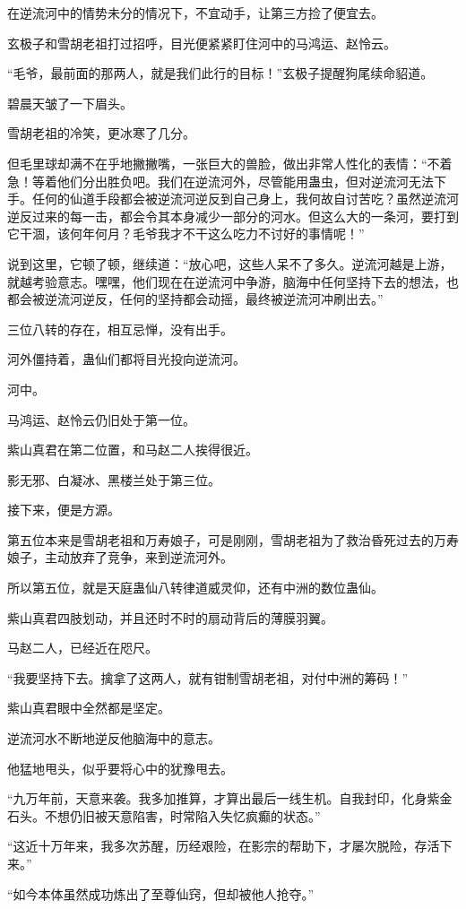 \begin{this_body}
在逆流河中的情势未分的情况下，不宜动手，让第三方捡了便宜去。

玄极子和雪胡老祖打过招呼，目光便紧紧盯住河中的马鸿运、赵怜云。

“毛爷，最前面的那两人，就是我们此行的目标！”玄极子提醒狗尾续命貂道。

碧晨天皱了一下眉头。

雪胡老祖的冷笑，更冰寒了几分。

但毛里球却满不在乎地撇撇嘴，一张巨大的兽脸，做出非常人性化的表情：“不着急！等着他们分出胜负吧。我们在逆流河外，尽管能用蛊虫，但对逆流河无法下手。任何的仙道手段都会被逆流河逆反到自己身上，我何故自讨苦吃？虽然逆流河逆反过来的每一击，都会令其本身减少一部分的河水。但这么大的一条河，要打到它干涸，该何年何月？毛爷我才不干这么吃力不讨好的事情呢！”

说到这里，它顿了顿，继续道：“放心吧，这些人呆不了多久。逆流河越是上游，就越考验意志。嘿嘿，他们现在在逆流河中争游，脑海中任何坚持下去的想法，也都会被逆流河逆反，任何的坚持都会动摇，最终被逆流河冲刷出去。”

三位八转的存在，相互忌惮，没有出手。

河外僵持着，蛊仙们都将目光投向逆流河。

河中。

马鸿运、赵怜云仍旧处于第一位。

紫山真君在第二位置，和马赵二人挨得很近。

影无邪、白凝冰、黑楼兰处于第三位。

接下来，便是方源。

第五位本来是雪胡老祖和万寿娘子，可是刚刚，雪胡老祖为了救治昏死过去的万寿娘子，主动放弃了竞争，来到逆流河外。

所以第五位，就是天庭蛊仙八转律道威灵仰，还有中洲的数位蛊仙。

紫山真君四肢划动，并且还时不时的扇动背后的薄膜羽翼。

马赵二人，已经近在咫尺。

“我要坚持下去。擒拿了这两人，就有钳制雪胡老祖，对付中洲的筹码！”

紫山真君眼中全然都是坚定。

逆流河水不断地逆反他脑海中的意志。

他猛地甩头，似乎要将心中的犹豫甩去。

“九万年前，天意来袭。我多加推算，才算出最后一线生机。自我封印，化身紫金石头。不想仍旧被天意陷害，时常陷入失忆疯癫的状态。”

“这近十万年来，我多次苏醒，历经艰险，在影宗的帮助下，才屡次脱险，存活下来。”

“如今本体虽然成功炼出了至尊仙窍，但却被他人抢夺。”


\end{this_body}
